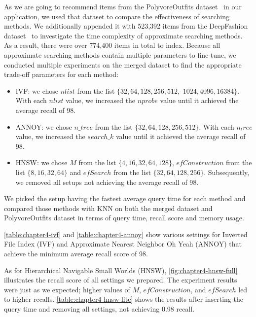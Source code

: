 As we are going to recommend items from the PolyvoreOutfits dataset~\cite{Mariya-ECCV18-Learning} in our application, we used that dataset to compare the effectiveness of searching methods. We additionally appended it with 523,392 items from the DeepFashion dataset~\cite{Liu-CVPR2016-DeepFashion} to investigate the time complexity of approximate searching methods. As a result, there were over 774,400 items in total to index.
Because all approximate searching methods contain multiple parameters to fine-tune, we conducted multiple experiments on the merged dataset to find the appropriate trade-off parameters for each method:
\begin{itemize}
    \item IVF: we chose $nlist$ from the list $\{32, 64, 128, 256, 512,$ $ 1024, 4096, 16384\}$. With each $nlist$ value, we increased the $nprobe$ value until it achieved the average recall of 98.
    \item ANNOY: we chose $n\_tree$ from the list $\{32, 64, 128, 256, 512\}$. With each $n_tree$ value,  we increased the $search\_k$ value until it achieved the average recall of 98.
    \item HNSW: we chose $M$ from the list $\{4, 16, 32, 64, 128\}$, $efConstruction$ from the list $\{8, 16, 32, 64\}$ and ${efSearch}$ from the list $\{32, 64, 128, 256\}$. Subsequently, we removed all setups not achieving the average recall of 98. 
\end{itemize}
We picked the setup having the fastest average query time for each method and compared those methods with KNN on both the merged dataset and PolyvoreOutfits dataset in terms of query time, recall score and memory usage.

\autoref{table:chapter4-ivf} and \autoref{table:chapter4-annoy} show various settings for Inverted File Index (IVF) and Approximate Nearest Neighbor Oh Yeah (ANNOY) that achieve the minimum average recall score of 98. 

As for Hierarchical Navigable Small Worlds (HNSW), \autoref{fig:chapter4-hnsw-full} illustrates the recall score of all settings we prepared. The experiment results were just as we expected; higher values of $M$, $efConstruction$, and $efSearch$ led to higher recalls. \autoref{table:chapter4-hnsw-lite} shows the results after inserting the query time and removing all settings, not achieving 0.98 recall. 

